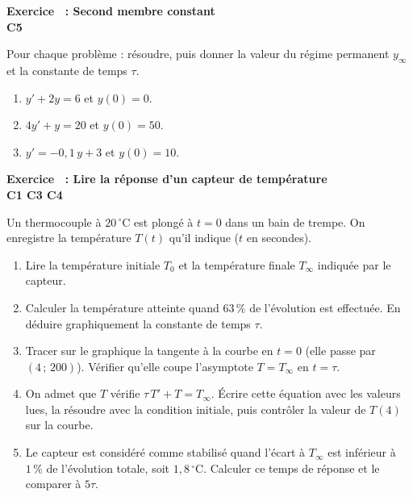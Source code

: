 \documentclass[a4paper,11pt]{article}
\newcounter{exo}
\newcommand{\exo}[4]{\needspace{0.5\textheight}\refstepcounter{exo}\label{exo:\theexo}\vspace{8pt}%
\begin{tcolorbox}[colback=uimmlightblue, colframe=uimmblue, boxrule=0.8pt, arc=2pt, left=6pt, right=6pt, top=3pt, bottom=3pt]
{\color{uimmblue}\bfseries Exercice \theexo\ : #1}\\
{\small\color{uimmred}\bfseries #2\quad #3}%
\if\relax\detokenize{#4}\relax\else\\{\footnotesize\color{uimmgray}\itshape #4}\fi
\end{tcolorbox}}
\newcommand{\rep}[1]{\par\noindent\begin{minipage}[t][#1cm]{\linewidth}\mbox{}\end{minipage}\par}
\begin{document}
\exo{Second membre constant}{C5}{[S01] [C01] [C02]}{}
Pour chaque problème : résoudre, puis donner la valeur du régime permanent $y_\infty$ et la constante de temps $\tau$.
\begin{enumerate}
  \needspace{4.6cm}
  \item $y' + 2y = 6$ et $y(0) = 0$.
  \rep{3}
  \needspace{4.6cm}
  \item $4y' + y = 20$ et $y(0) = 50$.
  \rep{3}
  \needspace{4.6cm}
  \item $y' = -0{,}1\,y + 3$ et $y(0) = 10$.
  \rep{3}
\end{enumerate}

\exo{Lire la réponse d'un capteur de température}{C1 C3 C4}{[S01] [C02]}{}
Un thermocouple à $20\,^\circ$C est plongé à $t = 0$ dans un bain de trempe. On enregistre la température $T(t)$ qu'il indique ($t$ en secondes).
\begin{center}
\end{center}
\begin{enumerate}
  \needspace{3.6cm}
  \item Lire la température initiale $T_0$ et la température finale $T_\infty$ indiquée par le capteur.
  \rep{1.5}
  \needspace{4.6cm}
  \item Calculer la température atteinte quand $63\,\%$ de l'évolution est effectuée. En déduire graphiquement la constante de temps $\tau$.
  \rep{2.5}
  \needspace{3.6cm}
  \item Tracer sur le graphique la tangente à la courbe en $t = 0$ (elle passe par $(4\,;\,200)$). Vérifier qu'elle coupe l'asymptote $T = T_\infty$ en $t = \tau$.
  \rep{1.5}
  \needspace{6.6cm}
  \item On admet que $T$ vérifie $\tau\,T' + T = T_\infty$. Écrire cette équation avec les valeurs lues, la résoudre avec la condition initiale, puis contrôler la valeur de $T(4)$ sur la courbe.
  \rep{4}
  \needspace{6.1cm}
  \item Le capteur est considéré comme stabilisé quand l'écart à $T_\infty$ est inférieur à $1\,\%$ de l'évolution totale, soit $1{,}8\,^\circ$C. Calculer ce temps de réponse et le comparer à $5\tau$.
  \rep{3.5}
\end{enumerate}
\end{document}
